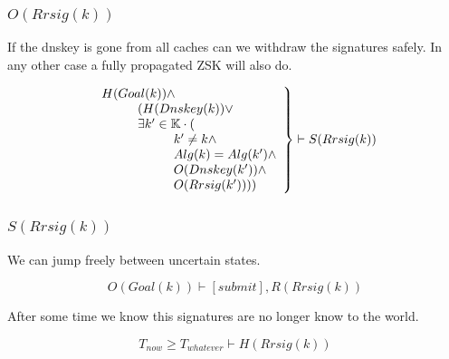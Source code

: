\documentclass[twoside,english, a4paper]{article}
\newcommand{\mathbox}[1]{#1}
\begin{document}
\subsubsection{$O(Rrsig(k))$}

\mathbox{

	If the dnskey is gone from all caches can we withdraw the 
	signatures safely. In any other case a fully propagated ZSK will 
	also do.

	\begin{equation}
		\left.
		\begin{array}{l}
\hskip 0cm			H(Goal(k)) \wedge  \\
\hskip 1cm			(H(Dnskey(k)) \vee \\
\hskip 1cm			\exists k' \in \mathbb{K} \cdot ( \\
\hskip 2cm				k' \not = k  \wedge\\
\hskip 2cm				Alg(k) = Alg(k')  \wedge\\
\hskip 2cm				O(Dnskey(k'))  \wedge\\
\hskip 2cm				O(Rrsig(k'))))
		\end{array}
		\right\} \vdash S(Rrsig(k))
	\end{equation}
}

\subsubsection{$S(Rrsig(k))$}

\mathbox{

	We can jump freely between uncertain states.

	\begin{equation}
		O(Goal(k)) \vdash [submit], R(Rrsig(k))
	\end{equation}

	After some time we know this signatures are no longer know to the
	world.
	
	\begin{equation}
		T_{now} \geq T_{whatever} \vdash H(Rrsig(k))
	\end{equation}
}
\end{document}
